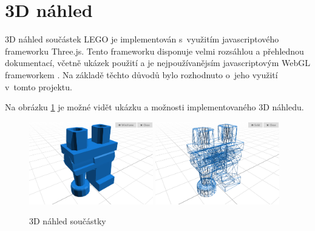\section{3D náhled}
3D náhled součástek LEGO je implementován s~využitím javascriptového frameworku Three.js. Tento frameworku disponuje velmi rozsáhlou a přehlednou dokumentací, včetně ukázek použití a je nejpoužívanějsím javascriptovým WebGL frameworkem \autocite{webgl-comparison}. Na základě těchto důvodů bylo rozhodnuto o~jeho využití v~tomto projektu.





Na obrázku \ref{obrazek-ldraw-shortcut} je možné vidět ukázku a možnosti implementovaného 3D náhledu.

\begin{figure}[htbp]
        \centering
        \includegraphics[width=0.48\textwidth,height=\textheight,keepaspectratio]{images/model-viewer-solid.png}
        \includegraphics[width=0.48\textwidth,height=\textheight,keepaspectratio]{images/model-viewer-wireframe.png}
        \caption{3D náhled součástky \label{obrazek-ldraw-shortcut}}
\end{figure}